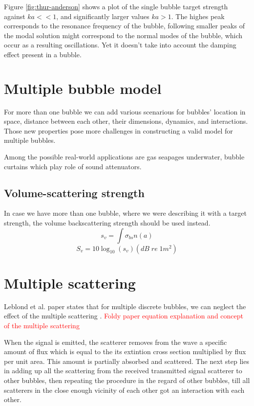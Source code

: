 Figure \ref*{fig:thur-anderson} shows a plot of the single bubble target strength against  $ka << 1$, and significantly larger values $ka > 1$. The highes peak corresponds to the resonance frequency of the bubble, following smaller peaks of the modal solution might correspond to the normal modes of the bubble, which occur as a resulting oscillations. Yet it doesn't take into account the damping effect present in a bubble.


\section{Multiple bubble model}

For more than one bubble we can add various scenarious for bubbles' location in space, distance between each other, their dimensions, dynamics, and interactions. Those new properties pose more challenges in constructing a valid model for multiple bubbles.

Among the possible real-world applications are gas seapages underwater, bubble curtains which play role of sound attenuators.


\subsection{Volume-scattering strength} 
In case we have more than one bubble, where we were describing it with a target strength, the volume backscattering strength should be used instead.
\[s_v = \int\sigma_{bs}n(a)\]
\[S_v = 10\log_{10}(s_v)(dB\;re\;1m^2)\]


\section{Multiple scattering }

Leblond et al. paper states that for multiple discrete bubbles, we can neglect the effect of the multiple scattering \cite[]{leblond_acoustic_2014}. 
\textcolor{red}{Foldy paper equation explanation and concept of the multiple scattering}

When the signal is emitted, the scatterer removes from the wave a specific amount of flux which is equal to the its extintion cross section multiplied by flux per unit area. This amount is partially absorbed and scattered. The next step lies in adding up all the scattering from the received transmitted signal scatterer to other bubbles, then repeating the procedure in the regard of other bubbles, till all scatterers in the close enough vicinity of each other got an interaction with each other.

